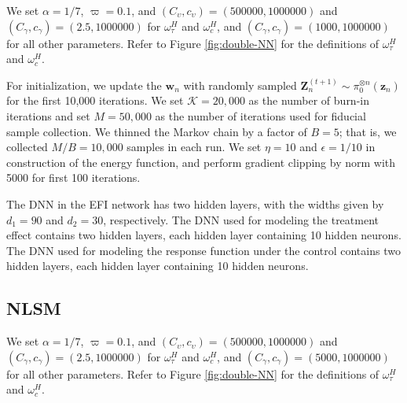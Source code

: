 \documentclass[11pt]{article}
\newcommand{\bz}{{\boldsymbol z}}
\newcommand{\bZ}{{\boldsymbol Z}}
\newcommand{\bw}{{\boldsymbol w}}
\newcommand{\mK}{\mathcal{K}}
\begin{document}
We set $\alpha=1/7$, $\varpi=0.1$, and 
$(C_{\upsilon},c_{\upsilon})=(500000,1000000)$ and $(C_{\gamma},c_{\gamma})=(2.5,1000000)$ for $\omega^{H}_{\tau}$ and $\omega^{H}_{c}$, and $(C_{\gamma},c_{\gamma})=(1000,1000000)$ for all other parameters. 
Refer to  Figure \ref{fig:double-NN} for the definitions of $\omega_{\tau}^H$ and $\omega_c^H$.




 For initialization, we update the $\bw_n$ with randomly sampled $\bZ_n^{(t+1)}\sim \pi_0^{\otimes n}(\bz_n)$ for the first 10,000 iterations. We set $\mK=20,000$ as the number of burn-in iterations and set $M=50,000$ as the number of iterations used for fiducial sample collection. We thinned the Markov chain by a factor of $B=5$; that is, we collected $M/B=10,000$ samples in each run. We set $\eta=10$ and $\epsilon=1/10$ in construction of the energy function, and perform gradient clipping by norm with 5000 for first 100 iterations. 

 
 The DNN in the EFI network has two hidden layers,  with the widths given by $d_1=90$ and $d_2=30$, respectively. The DNN used for modeling the treatment effect contains two hidden layers, each hidden layer 
 containing 10 hidden neurons. 
 The DNN used for modeling the response function under the control contains two hidden layers,  each hidden layer 
 containing 10 hidden neurons. 



\subsection{NLSM}



We set $\alpha=1/7$, $\varpi=0.1$, and 
$(C_{\upsilon},c_{\upsilon})=(500000,1000000)$ and $(C_{\gamma},c_{\gamma})=(2.5,1000000)$ for $\omega^{H}_{\tau}$ and $\omega^{H}_{c}$, and $(C_{\gamma},c_{\gamma})=(5000,1000000)$ for all other parameters. Refer to  Figure \ref{fig:double-NN} for the definitions of $\omega_{\tau}^H$ and $\omega_c^H$.
\end{document}
